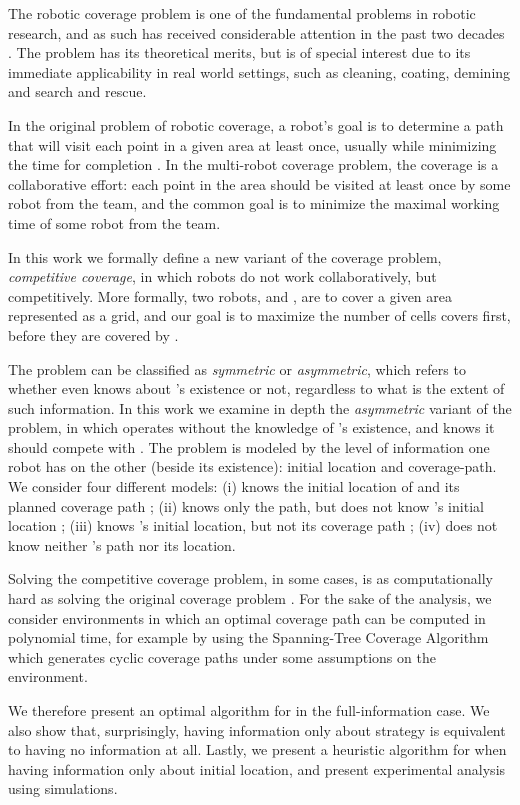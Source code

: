 The robotic coverage problem is one of the fundamental problems in robotic research, and as such has received considerable attention in the past two decades \cite{galceran2013survey}. The problem has its theoretical merits, but is of special interest due to its immediate applicability in real world settings, such as cleaning, coating, demining and search and rescue. 

In the original problem of robotic coverage, a robot's goal is to determine a path that will visit each point in a given area at least once, usually while minimizing the time for completion \cite{galceran2013survey}. In the multi-robot coverage problem, the coverage is a collaborative effort: each point in the area should be visited at least once by some robot from the team, and the common goal is to minimize the maximal working time of some robot from the team. 

In this work we formally define a new variant of the coverage problem, {\em competitive coverage}, in which robots do not work collaboratively, but competitively. More formally, two robots, \rob and \opp, are to cover a given area represented as a grid, and our goal is to maximize the number of cells \rob covers first, before they are covered by \opp.

The problem can be classified as {\em symmetric} or {\em asymmetric}, which refers to whether \opp even knows about \rob's existence or not, regardless to what is the extent of such information. In this work we examine in depth the {\em asymmetric} variant of the problem, in which \opp operates without the knowledge of \rob's existence, and \rob knows it should compete with \opp. The problem is modeled by the level of information one robot has on the other (beside its existence): initial location and coverage-path. We consider four different models: (i) \rob knows the initial location of \opp and its planned coverage path ; (ii) \rob knows only the path, but does not know \opp's initial location ; (iii) \rob knows \opp's initial location, but not its coverage path ; (iv) \rob does not know neither \opp's path nor its location.

Solving the competitive coverage problem, in some cases, is as computationally hard as solving the original coverage problem \cite{arkin2000approximation}. For the sake of the analysis, we consider environments in which an optimal coverage path can be computed in polynomial time, for example by using the Spanning-Tree Coverage Algorithm \cite{gabriely2001spanning} which generates cyclic coverage paths under some assumptions on the environment. 

We therefore present an optimal algorithm for \rob in the full-information case. We also show that, surprisingly, having information only about strategy is equivalent to having no information at all. Lastly, we present a heuristic algorithm for when having information only about initial location, and present experimental analysis using simulations. 